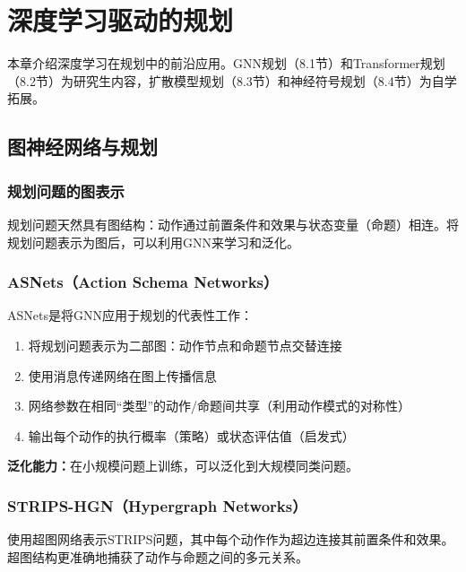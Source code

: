 \chapter{深度学习驱动的规划}

\begin{levelbox}
本章介绍深度学习在规划中的前沿应用。GNN规划（8.1节）和Transformer规划（8.2节）为研究生内容，扩散模型规划（8.3节）和神经符号规划（8.4节）为自学拓展。
\end{levelbox}

\section{图神经网络与规划 \grad}

\subsection{规划问题的图表示}

规划问题天然具有图结构：动作通过前置条件和效果与状态变量（命题）相连。将规划问题表示为图后，可以利用GNN来学习和泛化。

\subsection{ASNets（Action Schema Networks）}

ASNets是将GNN应用于规划的代表性工作：

\begin{algbox}[title={\textbf{ASNets核心思想}}]
\begin{enumerate}
  \item 将规划问题表示为二部图：动作节点和命题节点交替连接
  \item 使用消息传递网络在图上传播信息
  \item 网络参数在相同``类型''的动作/命题间共享（利用动作模式的对称性）
  \item 输出每个动作的执行概率（策略）或状态评估值（启发式）
\end{enumerate}
\textbf{泛化能力：}在小规模问题上训练，可以泛化到大规模同类问题。
\end{algbox}

\subsection{STRIPS-HGN（Hypergraph Networks）}

使用超图网络表示STRIPS问题，其中每个动作作为超边连接其前置条件和效果。超图结构更准确地捕获了动作与命题之间的多元关系。

